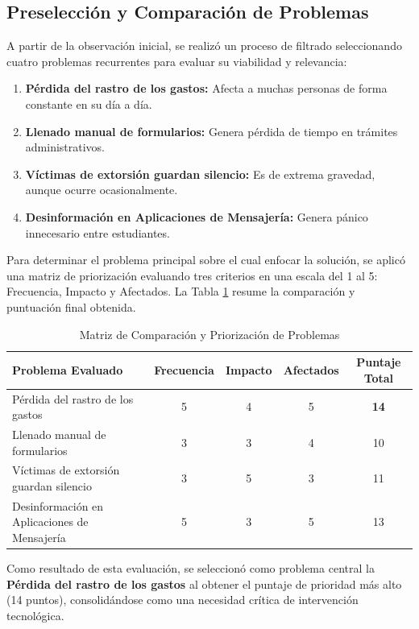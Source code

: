 \documentclass[12pt]{article}
\begin{document}
\subsection{Preselección y Comparación de Problemas}
A partir de la observación inicial, se realizó un proceso de filtrado seleccionando cuatro problemas recurrentes para evaluar su viabilidad y relevancia:
\begin{enumerate}
    \item \textbf{Pérdida del rastro de los gastos:} Afecta a muchas personas de forma constante en su día a día.
    \item \textbf{Llenado manual de formularios:} Genera pérdida de tiempo en trámites administrativos.
    \item \textbf{Víctimas de extorsión guardan silencio:} Es de extrema gravedad, aunque ocurre ocasionalmente.
    \item \textbf{Desinformación en Aplicaciones de Mensajería:} Genera pánico innecesario entre estudiantes.
\end{enumerate}

Para determinar el problema principal sobre el cual enfocar la solución, se aplicó una matriz de priorización evaluando tres criterios en una escala del 1 al 5: Frecuencia, Impacto y Afectados. La Tabla \ref{tab:comparacion_problemas} resume la comparación y puntuación final obtenida.

\begin{table}[H]
\centering
\caption{Matriz de Comparación y Priorización de Problemas}
\label{tab:comparacion_problemas}
\begin{tabular}{p{7.5cm}cccc}
\toprule
\textbf{Problema Evaluado} & \textbf{Frecuencia} & \textbf{Impacto} & \textbf{Afectados} & \textbf{Puntaje Total} \\
\midrule
Pérdida del rastro de los gastos & 5 & 4 & 5 & \textbf{14} \\
Llenado manual de formularios & 3 & 3 & 4 & 10 \\
Víctimas de extorsión guardan silencio & 3 & 5 & 3 & 11 \\
Desinformación en Aplicaciones de Mensajería & 5 & 3 & 5 & 13 \\
\bottomrule
\end{tabular}
\end{table}

Como resultado de esta evaluación, se seleccionó como problema central la \textbf{Pérdida del rastro de los gastos} al obtener el puntaje de prioridad más alto (14 puntos), consolidándose como una necesidad crítica de intervención tecnológica.
\end{document}
